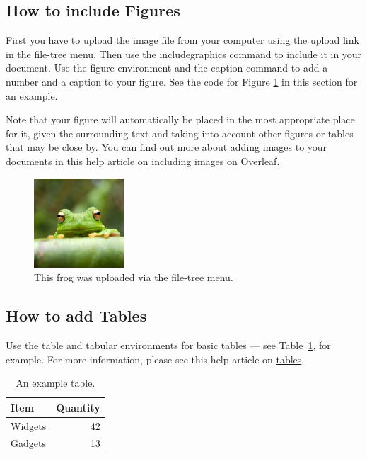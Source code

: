 \documentclass{article}
\begin{document}
\subsection{How to include Figures}

First you have to upload the image file from your computer using the upload link in the file-tree menu. Then use the includegraphics command to include it in your document. Use the figure environment and the caption command to add a number and a caption to your figure. See the code for Figure \ref{fig:frog} in this section for an example.

Note that your figure will automatically be placed in the most appropriate place for it, given the surrounding text and taking into account other figures or tables that may be close by. You can find out more about adding images to your documents in this help article on \href{https://www.overleaf.com/learn/how-to/Including_images_on_Overleaf}{including images on Overleaf}.

\begin{figure}
\centering
\includegraphics[width=0.3\textwidth]{frog.jpg}
\caption{\label{fig:frog}This frog was uploaded via the file-tree menu.}
\end{figure}

\subsection{How to add Tables}

Use the table and tabular environments for basic tables --- see Table~\ref{tab:widgets}, for example. For more information, please see this help article on \href{https://www.overleaf.com/learn/latex/tables}{tables}. 

\begin{table}
\centering
\begin{tabular}{l|r}
Item & Quantity \\\hline
Widgets & 42 \\
Gadgets & 13
\end{tabular}
\caption{\label{tab:widgets}An example table.}
\end{table}
\end{document}
